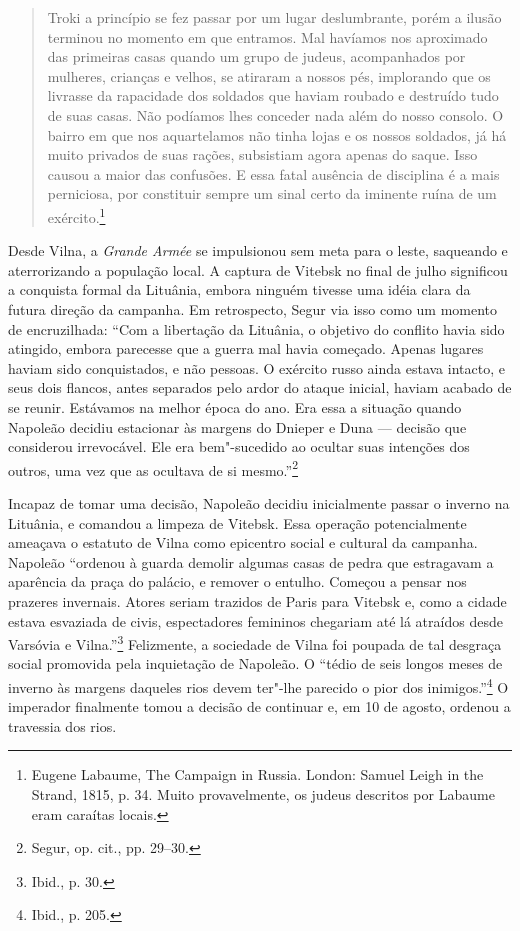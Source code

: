 \begin{quote}
Troki a princípio se fez passar por um lugar deslumbrante, porém a
ilusão terminou no momento em que entramos. Mal havíamos nos aproximado
das primeiras casas quando um grupo de judeus, acompanhados por
mulheres, crianças e velhos, se atiraram a nossos pés, implorando que os
livrasse da rapacidade dos soldados que haviam roubado e destruído tudo
de suas casas. Não podíamos lhes conceder nada além do nosso consolo. O
bairro em que nos aquartelamos não tinha lojas e os nossos soldados, já
há muito privados de suas rações, subsistiam agora apenas do saque. Isso
causou a maior das confusões. E essa fatal ausência de disciplina é a
mais perniciosa, por constituir sempre um sinal certo da iminente ruína
de um exército.\footnote{Eugene Labaume, The Campaign in Russia. London:
  Samuel Leigh in the Strand, 1815, p. 34. Muito provavelmente, os
  judeus descritos por Labaume eram caraítas locais.}
\end{quote}

Desde Vilna, a \emph{Grande Armée} se impulsionou sem meta para o leste,
saqueando e aterrorizando a população local. A captura de Vitebsk no
final de julho significou a conquista formal da Lituânia, embora ninguém
tivesse uma idéia clara da futura direção da campanha. Em retrospecto,
Segur via isso como um momento de encruzilhada: ``Com a libertação da
Lituânia, o objetivo do conflito havia sido atingido, embora parecesse
que a guerra mal havia começado. Apenas lugares haviam sido
conquistados, e não pessoas. O exército russo ainda estava intacto, e
seus dois flancos, antes separados pelo ardor do ataque inicial, haviam
acabado de se reunir. Estávamos na melhor época do ano. Era essa a
situação quando Napoleão decidiu estacionar às margens do Dnieper e Duna
--- decisão que considerou irrevocável. Ele era bem"-sucedido ao ocultar
suas intenções dos outros, uma vez que as ocultava de si
mesmo.''\footnote{Segur, op. cit., pp. 29--30.}

Incapaz de tomar uma decisão, Napoleão decidiu inicialmente passar o
inverno na Lituânia, e comandou a limpeza de Vitebsk. Essa operação
potencialmente ameaçava o estatuto de Vilna como epicentro social e
cultural da campanha. Napoleão ``ordenou à guarda demolir algumas casas
de pedra que estragavam a aparência da praça do palácio, e remover o
entulho. Começou a pensar nos prazeres invernais. Atores seriam trazidos
de Paris para Vitebsk e, como a cidade estava esvaziada de civis,
espectadores femininos chegariam até lá atraídos desde Varsóvia e
Vilna.''\footnote{Ibid., p. 30.} Felizmente, a sociedade de Vilna foi
poupada de tal desgraça social promovida pela inquietação de Napoleão. O
``tédio de seis longos meses de inverno às margens daqueles rios devem
ter"-lhe parecido o pior dos inimigos.''\footnote{Ibid., p. 205.} O
imperador finalmente tomou a decisão de continuar e, em 10 de agosto,
ordenou a travessia dos rios.

